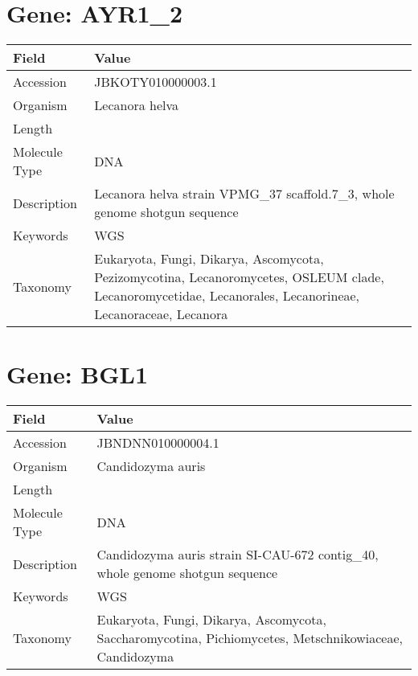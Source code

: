\documentclass[10pt]{article}
\begin{document}
\section{Gene: AYR1\_2}
{\footnotesize
\begin{longtable}{>{\raggedright\arraybackslash}p{4.5cm} >{\raggedright\arraybackslash}p{11.5cm}}
\textbf{Field} & \textbf{Value} \\
\hline
Accession & JBKOTY010000003.1 \\
Organism & Lecanora helva \\
Length & 3154666 \\
Molecule Type & DNA \\
Description & Lecanora helva strain VPMG\_37 scaffold.7\_3, whole genome shotgun sequence \\
Keywords & WGS \\
Taxonomy & Eukaryota, Fungi, Dikarya, Ascomycota, Pezizomycotina, Lecanoromycetes, OSLEUM clade, Lecanoromycetidae, Lecanorales, Lecanorineae, Lecanoraceae, Lecanora \\
\end{longtable}
}

\vspace{1em}
\section{Gene: BGL1}
{\footnotesize
\begin{longtable}{>{\raggedright\arraybackslash}p{4.5cm} >{\raggedright\arraybackslash}p{11.5cm}}
\textbf{Field} & \textbf{Value} \\
\hline
Accession & JBNDNN010000004.1 \\
Organism & Candidozyma auris \\
Length & 779665 \\
Molecule Type & DNA \\
Description & Candidozyma auris strain SI-CAU-672 contig\_40, whole genome shotgun sequence \\
Keywords & WGS \\
Taxonomy & Eukaryota, Fungi, Dikarya, Ascomycota, Saccharomycotina, Pichiomycetes, Metschnikowiaceae, Candidozyma \\
\end{longtable}
}

\vspace{1em}
\end{document}
